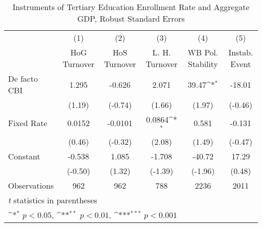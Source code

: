 \begin{table}[htbp]\centering
\def\sym#1{\ifmmode^{#1}\else\(^{#1}\)\fi}
\caption{Instruments of Tertiary Education Enrollment Rate and Aggregate GDP, Robust Standard Errors \label{ifivs2}}
\begin{tabular}{l*{5}{c}}
\toprule
                                        &\multicolumn{1}{c}{(1)}&\multicolumn{1}{c}{(2)}&\multicolumn{1}{c}{(3)}&\multicolumn{1}{c}{(4)}&\multicolumn{1}{c}{(5)}\\
                                        &\multicolumn{1}{c}{HoG Turnover}&\multicolumn{1}{c}{HoS Turnover}&\multicolumn{1}{c}{L. H. Turnover}&\multicolumn{1}{c}{WB Pol. Stability}&\multicolumn{1}{c}{Instab. Event}\\
\midrule
De facto CBI                            &    1.295         &   -0.626         &    2.071         &    39.47\sym{*}  &   -18.01         \\
                                        &   (1.19)         &  (-0.74)         &   (1.66)         &   (1.97)         &  (-0.46)         \\
\addlinespace
Fixed Rate                              &   0.0152         &  -0.0101         &   0.0864\sym{*}  &    0.581         &   -0.131         \\
                                        &   (0.46)         &  (-0.32)         &   (2.08)         &   (1.49)         &  (-0.47)         \\
\addlinespace
Constant                                &   -0.538         &    1.085         &   -1.708         &   -40.72         &    17.29         \\
                                        &  (-0.50)         &   (1.32)         &  (-1.39)         &  (-1.96)         &   (0.48)         \\
\midrule
Observations                            &      962         &      962         &      788         &     2236         &     2011         \\
\bottomrule
\multicolumn{6}{l}{\footnotesize \textit{t} statistics in parentheses}\\
\multicolumn{6}{l}{\footnotesize \sym{*} \(p<0.05\), \sym{**} \(p<0.01\), \sym{***} \(p<0.001\)}\\
\end{tabular}
\end{table}
